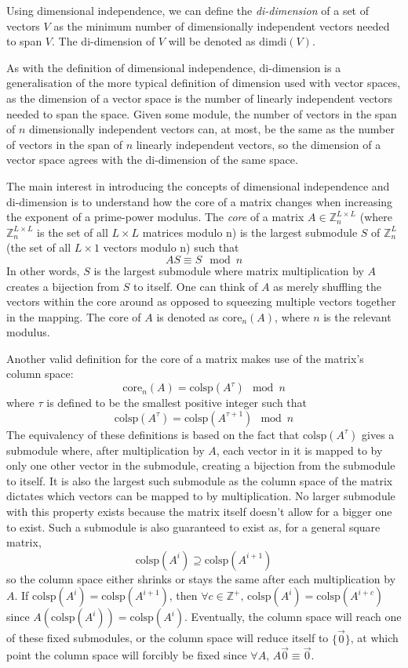 \documentclass[a4paper, reqno, 12pt]{amsart}
\newcommand\dimdi[1]{\text{dimdi}(#1)}
\newcommand\core[2]{\text{core}_{#1}(#2)}
\newcommand\colsp[1]{\text{colsp}(#1)}
\begin{document}
	Using dimensional independence, we can define the \emph{di-dimension} of a set of vectors $V$ as the minimum number of dimensionally independent vectors needed to 
	span $V$. The di-dimension of $V$ will be denoted as $\dimdi{V}$.
	
	As with the definition of dimensional independence, di-dimension is a generalisation of the more typical definition of dimension used with vector spaces, as
	the dimension of a vector space is the number of linearly independent vectors needed to span the space. Given some module, the number of vectors in the span of 
	$n$ dimensionally independent vectors can, at most, be the same as the number of vectors in the span of $n$ linearly independent vectors, so the dimension of a 
	vector space agrees with the di-dimension of the same space.
	
	The main interest in introducing the concepts of dimensional independence and di-dimension is to understand how the core of a matrix changes when increasing 
	the exponent of a prime-power modulus. The \emph{core} of a matrix $A \in \mathds{Z}_{n}^{L \times L}$ (where $\mathds{Z}_{n}^{L \times L}$ is the set of 
	all $L \times L$ matrices modulo n) is the largest submodule $S$ of $\mathds{Z}_{n}^{L}$ (the set of all $L \times 1$ vectors modulo n) such that
	\[
		AS \equiv S \mod{n}
	\]
	In other words, $S$ is the largest submodule where matrix multiplication by $A$ creates a bijection from $S$ to itself. One can think of $A$ as merely shuffling
	the vectors within the core around as opposed to squeezing multiple vectors together in the mapping. The core of $A$ is denoted as $\core{n}{A}$, where $n$ is the
	relevant modulus.
	
	Another valid definition for the core of a matrix makes use of the matrix's column space:
	\[
		\core{n}{A} = \colsp{A^\tau} \mod{n}
	\]
	where $\tau$ is defined to be the smallest positive integer such that
	\[
		\colsp{A^\tau} = \colsp{A^{\tau + 1}} \mod{n}
	\]
	The equivalency of these definitions is based on the fact that $\colsp{A^\tau}$ gives a submodule where, after multiplication by $A$, each vector in it is mapped 
	to by only one other vector in the submodule, creating a bijection from the submodule to itself. It is also the largest such submodule as the column space of the 
	matrix dictates which vectors can be mapped to by multiplication. No larger submodule with this property exists because the matrix itself doesn't allow for a 
	bigger one to exist. Such a submodule is also guaranteed to exist as, for a general square matrix,
	\[
		\colsp{A^{i}} \supseteq \colsp{A^{i+1}}
	\]
	so the column space either shrinks or stays the same after each multiplication by $A$. If $\colsp{A^{i}} = \colsp{A^{i+1}}$, then 
	$\forall c \in \mathds{Z}^{+}, \, \colsp{A^{i}} = \colsp{A^{i+c}}$ since $A(\colsp{A^i}) = \colsp{A^i}$. Eventually, the column space will reach one of 
	these fixed submodules, or the column space will reduce itself to $\{\vec{0}\}$, at which point the column space will forcibly be fixed since 
	$\forall A, \, A\vec{0} \equiv \vec{0}$.
	
\end{document}
